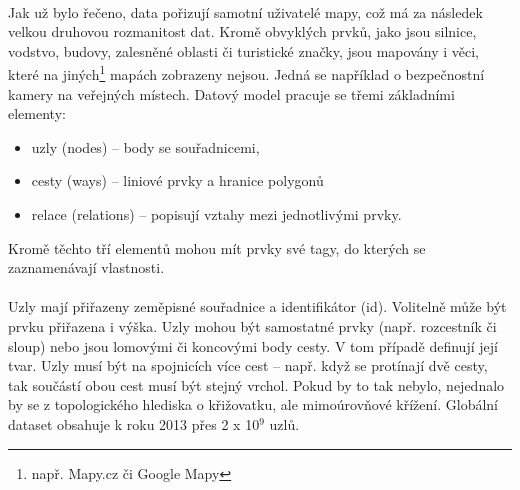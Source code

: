 \documentclass[11pt,a4paper,titlepage,oneside]{book}
\begin{document}
		\paragraph{} Jak už bylo řečeno, data pořizují samotní uživatelé mapy, což má za následek velkou druhovou rozmanitost dat. Kromě obvyklých prvků, jako jsou silnice, vodstvo, budovy, zalesněné oblasti či turistické značky, jsou mapovány i věci, které na jiných\footnote{např. Mapy.cz či Google Mapy} mapách zobrazeny nejsou. Jedná se například o bezpečnostní kamery na veřejných místech. Datový model pracuje se třemi základními elementy:
	\begin{itemize}
		\item uzly (nodes) -- body se souřadnicemi,


		\item cesty (ways) -- liniové prvky a hranice polygonů


		\item relace (relations) -- popisují vztahy mezi jednotlivými prvky.
	\end{itemize}
Kromě těchto tří elementů mohou mít prvky své tagy, do kterých se zaznamenávají  vlastnosti. 	


		\paragraph{}Uzly mají přiřazeny zeměpisné souřadnice a identifikátor (id). Volitelně může být prvku přiřazena i výška. Uzly mohou být samostatné prvky (např. rozcestník či sloup) nebo jsou lomovými či koncovými body cesty. V tom případě definují její tvar. Uzly musí být na spojnicích více cest -- např. když se protínají dvě cesty, tak součástí obou cest musí být stejný vrchol. Pokud by to tak nebylo, nejednalo by se z topologického hlediska o křižovatku, ale mimoúrovňové křížení. Globální dataset obsahuje k roku 2013 přes 2 x 10$^9$ uzlů\cite{osm_wiki_node}.

\end{document}
